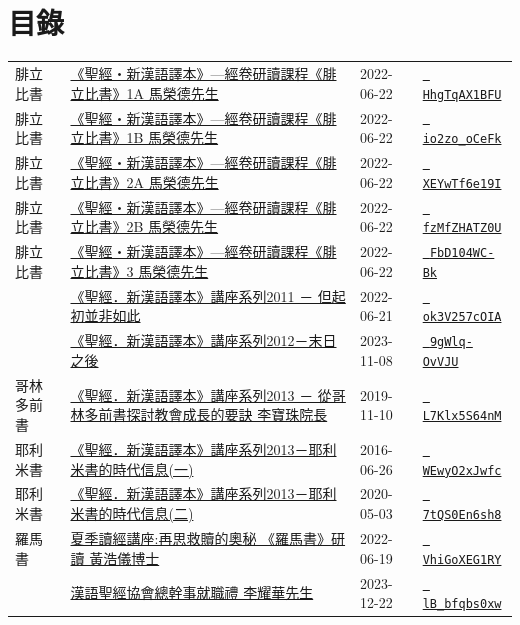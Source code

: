 \documentclass{book}
\begin{document}
\section{目錄}
\label{sec:index}
{ \scriptsize


\begin{xltabular}{\textwidth}{|p{0.15\textwidth} p{0.6\textwidth}|p{0.07\textwidth} p{0.1\textwidth}|}
\hline
腓立比書   & \hyperref[sec:HhgTqAX1BFU]{《聖經‧新漢語譯本》—經卷研讀課程《腓立比書》1A 馬榮德先生} & 2022-06-22 & \href{https://youtube.com/watch?v=HhgTqAX1BFU}{\texttt{ HhgTqAX1BFU}} \\
腓立比書   & \hyperref[sec:io2zo_oCeFk]{《聖經‧新漢語譯本》—經卷研讀課程《腓立比書》1B 馬榮德先生} & 2022-06-22 & \href{https://youtube.com/watch?v=io2zo_oCeFk}{\texttt{ io2zo\_oCeFk}} \\
腓立比書   & \hyperref[sec:XEYwTf6e19I]{《聖經‧新漢語譯本》—經卷研讀課程《腓立比書》2A 馬榮德先生} & 2022-06-22 & \href{https://youtube.com/watch?v=XEYwTf6e19I}{\texttt{ XEYwTf6e19I}} \\
腓立比書   & \hyperref[sec:fzMfZHATZ0U]{《聖經‧新漢語譯本》—經卷研讀課程《腓立比書》2B 馬榮德先生} & 2022-06-22 & \href{https://youtube.com/watch?v=fzMfZHATZ0U}{\texttt{ fzMfZHATZ0U}} \\
腓立比書   & \hyperref[sec:FbD104WC_Bk]{《聖經‧新漢語譯本》—經卷研讀課程《腓立比書》3 馬榮德先生} & 2022-06-22 & \href{https://youtube.com/watch?v=FbD104WC-Bk}{\texttt{ FbD104WC-Bk}} \\
    & \hyperref[sec:ok3V257cOIA]{《聖經．新漢語譯本》講座系列2011 － 但起初並非如此} & 2022-06-21 & \href{https://youtube.com/watch?v=ok3V257cOIA}{\texttt{ ok3V257cOIA}} \\
    & \hyperref[sec:9gWlq_OvVJU]{《聖經．新漢語譯本》講座系列2012－末日之後} & 2023-11-08 & \href{https://youtube.com/watch?v=9gWlq-OvVJU}{\texttt{ 9gWlq-OvVJU}} \\
哥林多前書   & \hyperref[sec:L7Klx5S64nM]{《聖經．新漢語譯本》講座系列2013 － 從哥林多前書探討教會成長的要訣 李寶珠院長} & 2019-11-10 & \href{https://youtube.com/watch?v=L7Klx5S64nM}{\texttt{ L7Klx5S64nM}} \\
耶利米書   & \hyperref[sec:WEwyO2xJwfc]{《聖經．新漢語譯本》講座系列2013－耶利米書的時代信息(一)} & 2016-06-26 & \href{https://youtube.com/watch?v=WEwyO2xJwfc}{\texttt{ WEwyO2xJwfc}} \\
耶利米書   & \hyperref[sec:7tQS0En6sh8]{《聖經．新漢語譯本》講座系列2013－耶利米書的時代信息(二)} & 2020-05-03 & \href{https://youtube.com/watch?v=7tQS0En6sh8}{\texttt{ 7tQS0En6sh8}} \\
羅馬書   & \hyperref[sec:VhiGoXEG1RY]{夏季讀經講座:再思救贖的奧秘 《羅馬書》研讀 黃浩儀博士} & 2022-06-19 & \href{https://youtube.com/watch?v=VhiGoXEG1RY}{\texttt{ VhiGoXEG1RY}} \\
    & \hyperref[sec:lB_bfqbs0xw]{漢語聖經協會總幹事就職禮 李耀華先生} & 2023-12-22 & \href{https://youtube.com/watch?v=lB_bfqbs0xw}{\texttt{ lB\_bfqbs0xw}} \\
\end{xltabular}
}
\newpage
\end{document}
